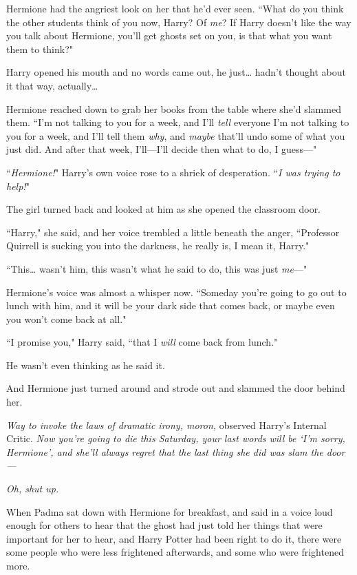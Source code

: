 Hermione had the angriest look on her that he'd ever seen. ``What do you think the other students think of you now, Harry? Of \emph{me}? If Harry doesn't like the way you talk about Hermione, you'll get ghosts set on you, is that what you want them to think?"

Harry opened his mouth and no words came out, he just{\ldots} hadn't thought about it that way, actually{\ldots}

Hermione reached down to grab her books from the table where she'd slammed them. ``I'm not talking to you for a week, and I'll \emph{tell} everyone I'm not talking to you for a week, and I'll tell them \emph{why}, and \emph{maybe} that'll undo some of what you just did. And after that week, I'll---I'll decide then what to do, I guess---"

``\emph{Hermione!}" Harry's own voice rose to a shriek of desperation. ``\emph{I was trying to help!}"

The girl turned back and looked at him as she opened the classroom door.

``Harry," she said, and her voice trembled a little beneath the anger, ``Professor Quirrell is sucking you into the darkness, he really is, I mean it, Harry."

``This{\ldots} wasn't him, this wasn't what he said to do, this was just \emph{me}---"

Hermione's voice was almost a whisper now. ``Someday you're going to go out to lunch with him, and it will be your dark side that comes back, or maybe even you won't come back at all."

``I promise you," Harry said, ``that I \emph{will} come back from lunch."

He wasn't even thinking as he said it.

And Hermione just turned around and strode out and slammed the door behind her.

\emph{Way to invoke the laws of dramatic irony, moron,} observed Harry's Internal Critic. \emph{Now you're going to die this Saturday, your last words will be `I'm sorry, Hermione', and she'll always regret that the last thing she did was slam the door---}

\emph{Oh, shut up.}

\later

When Padma sat down with Hermione for breakfast, and said in a voice loud enough for others to hear that the ghost had just told her things that were important for her to hear, and Harry Potter had been right to do it, there were some people who were less frightened afterwards, and some who were frightened more.

